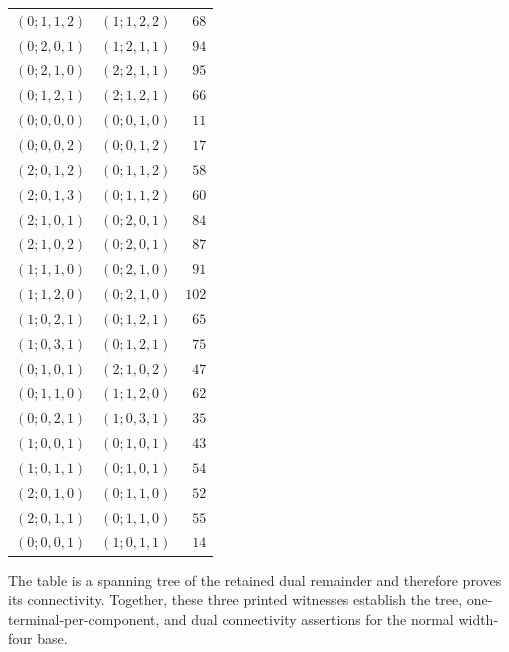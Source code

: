 \begin{longtable}{@{}rrr@{}}
$(0;1,1,2)$ & $(1;1,2,2)$ & $68$\\
$(0;2,0,1)$ & $(1;2,1,1)$ & $94$\\
$(0;2,1,0)$ & $(2;2,1,1)$ & $95$\\
$(0;1,2,1)$ & $(2;1,2,1)$ & $66$\\
$(0;0,0,0)$ & $(0;0,1,0)$ & $11$\\
$(0;0,0,2)$ & $(0;0,1,2)$ & $17$\\
$(2;0,1,2)$ & $(0;1,1,2)$ & $58$\\
$(2;0,1,3)$ & $(0;1,1,2)$ & $60$\\
$(2;1,0,1)$ & $(0;2,0,1)$ & $84$\\
$(2;1,0,2)$ & $(0;2,0,1)$ & $87$\\
$(1;1,1,0)$ & $(0;2,1,0)$ & $91$\\
$(1;1,2,0)$ & $(0;2,1,0)$ & $102$\\
$(1;0,2,1)$ & $(0;1,2,1)$ & $65$\\
$(1;0,3,1)$ & $(0;1,2,1)$ & $75$\\
$(0;1,0,1)$ & $(2;1,0,2)$ & $47$\\
$(0;1,1,0)$ & $(1;1,2,0)$ & $62$\\
$(0;0,2,1)$ & $(1;0,3,1)$ & $35$\\
$(1;0,0,1)$ & $(0;1,0,1)$ & $43$\\
$(1;0,1,1)$ & $(0;1,0,1)$ & $54$\\
$(2;0,1,0)$ & $(0;1,1,0)$ & $52$\\
$(2;0,1,1)$ & $(0;1,1,0)$ & $55$\\
$(0;0,0,1)$ & $(1;0,1,1)$ & $14$\\
\bottomrule
\end{longtable}
The table is a spanning tree of the retained dual remainder and therefore proves its connectivity.  Together, these three printed witnesses establish the tree, one-terminal-per-component, and dual connectivity assertions for the normal width-four base.
